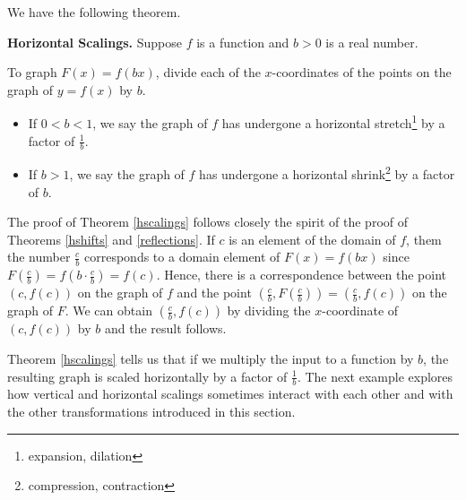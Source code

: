 We have the following theorem.

\smallskip

\colorbox{ResultColor}{\bbm


\begin{thm}  \label{hscalings}\textbf{Horizontal Scalings.}  Suppose $f$ is a function and $b>0$ is a real number.

To graph $F(x) = f(bx)$, divide each of the $x$-coordinates of the points on the graph of $y=f(x)$ by $b$. 


\begin{itemize}

\item If $0 < b < 1$, we say the graph of $f$ has undergone a horizontal stretch\footnote{expansion, dilation} by a factor of $\frac{1}{b}$. 

\item If $b > 1$, we say the graph of $f$ has undergone a horizontal shrink\footnote{compression, contraction} by a factor of $b$.

\end{itemize}

\end{thm}

\ebm}

\smallskip

The proof of Theorem \ref{hscalings} follows closely the spirit of the proof of Theorems \ref{hshifts} and \ref{reflections}.  If $c$ is an element of the domain of $f$, them the number $\frac{c}{b}$ corresponds to a domain element of $F(x)= f(bx)$ since $F\left(\frac{c}{b} \right) = f\left( b \cdot \frac{c}{b} \right) = f(c)$.  Hence, there is a correspondence between the point  $(c, f(c))$ on the graph of $f$ and the point $\left( \frac{c}{b}, F\left(\frac{c}{b}\right) \right)= \left( \frac{c}{b}, f(c) \right)$ on the graph of $F$.  We can obtain    $ \left( \frac{c}{b}, f(c) \right)$ by dividing the $x$-coordinate of $(c, f(c))$ by $b$ and the result follows.  

\smallskip

Theorem \ref{hscalings} tells us that if we multiply the input to a function by $b$, the resulting graph is scaled horizontally by a factor of $\frac{1}{b}$.    The next example explores how vertical and horizontal scalings sometimes interact with each other and with the other transformations introduced in this section. 

\smallskip

